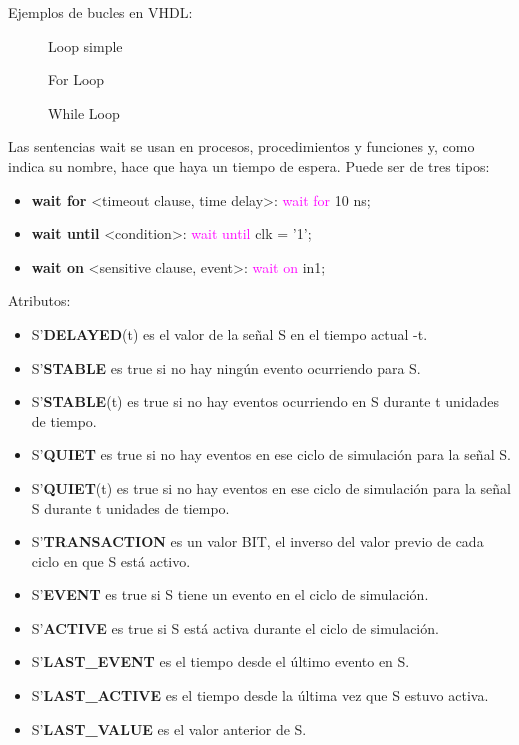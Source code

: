 Ejemplos de bucles en VHDL:
\begin{multicols}{3}
	\begin{figure}[H]
		\centering
		
		\caption{Loop simple}
	\end{figure}
	\vfill
	\begin{figure}[H]
		\centering
		
		\caption{For Loop}
	\end{figure}
	\vfill
	\begin{figure}[H]
		\centering
		
		\caption{While Loop}
	\end{figure}
\end{multicols}

Las sentencias wait se usan en procesos, procedimientos y funciones y, como indica su nombre, hace que haya un tiempo de espera. Puede ser de tres tipos:
\begin{itemize}
	\item\textbf{wait for} <timeout clause, time delay>: \textcolor{magenta}{wait for} 10 ns;
	\item\textbf{wait until} <condition>: \textcolor{magenta}{wait until} clk = '1';
	\item\textbf{wait on} <sensitive clause, event>: \textcolor{magenta}{wait on} in1;
\end{itemize}


Atributos:
\begin{itemize}
	\item S'\textbf{DELAYED}(t) es el valor de la señal S en el tiempo actual -t.
	\item S'\textbf{STABLE} es true si no hay ningún evento ocurriendo para S.
	\item S'\textbf{STABLE}(t) es true si no hay eventos ocurriendo en S durante t unidades de tiempo.
	\item S'\textbf{QUIET} es true si no hay eventos en ese ciclo de simulación para la señal S.
	\item S'\textbf{QUIET}(t) es true si no hay eventos en ese ciclo de simulación para la señal S durante t unidades de tiempo.
	\item S'\textbf{TRANSACTION} es un valor BIT, el inverso del valor previo de cada ciclo en que S está activo.
	\item S'\textbf{EVENT} es true si S tiene un evento en el ciclo de simulación.
	\item S'\textbf{ACTIVE} es true si S está activa durante el ciclo de simulación.
	\item S'\textbf{LAST\_EVENT} es el tiempo desde el último evento en S.
	\item S'\textbf{LAST\_ACTIVE} es el tiempo desde la última vez que S estuvo activa.
	\item S'\textbf{LAST\_VALUE} es el valor anterior de S.
\end{itemize}

